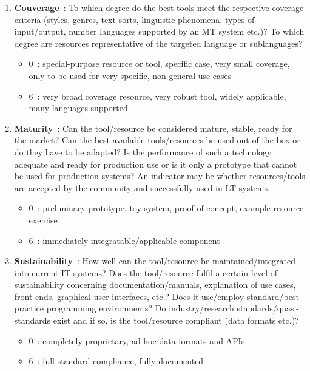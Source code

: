 \documentclass[]{../metanetpaper}
\begin{document}
\begin{multicols}{2}
\begin{enumerate}
\item {\bf Couverage}~: To which degree do the best tools meet the respective coverage criteria (styles, genres, text sorts, linguistic phenomena, types of input/output, number languages supported by an MT system etc.)? To which degree are resources representative of the targeted language or sublanguages?
      \begin{itemize}
      \item 0~: special-purpose resource or tool, specific case, very small coverage, only to be used for very specific, non-general use cases
      \item 6~: very broad coverage resource, very robust tool, widely applicable, many languages supported
      \end{itemize}

\item {\bf Maturity}~: Can the tool/resource be considered mature, stable, ready for the market? Can the best available tools/resources be used out-of-the-box or do they have to be adapted? Is the performance of such a technology adequate and ready for production use or is it only a prototype that cannot be used for production systems? An indicator may be whether resources/tools are accepted by the community and successfully used in LT systems.  
     \begin{itemize}
      \item 0~: preliminary prototype, toy system, proof-of-concept, example resource exercise
      \item 6~: immediately integratable/applicable component
      \end{itemize}

\item {\bf Sustainability}~: How well can the tool/resource be maintained/integrated into current IT systems? Does the tool/resource fulfil a certain level of sustainability concerning documentation/manuals, explanation of use cases, front-ends, graphical user interfaces, etc.? Does it use/employ standard/best-practice programming environments? Do industry/research standards/quasi-standards exist and if so, is the tool/resource compliant (data formats etc.)?
      \begin{itemize}
      \item 0~: completely proprietary, ad hoc data formats and APIs
      \item 6~: full standard-compliance, fully documented
      \end{itemize}


\end{enumerate}
\end{multicols}
\end{document}
